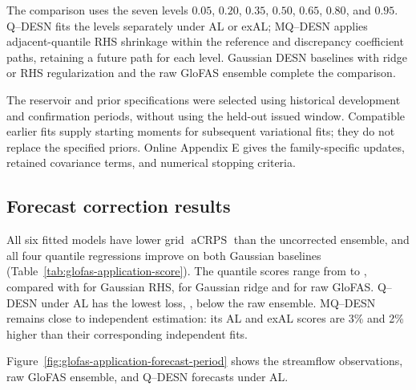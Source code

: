\documentclass[12pt,letterpaper]{article}
\numberwithin{equation}{section}
\newcommand{\aCRPS}{\operatorname{aCRPS}}
\newcommand{\TableStyle}{%
  \footnotesize
  \setlength{\tabcolsep}{4.5pt}%
  \renewcommand{\arraystretch}{1.12}%
}
\begin{document}
The comparison uses the seven levels \(0.05\), \(0.20\), \(0.35\), \(0.50\),
\(0.65\), \(0.80\), and \(0.95\). Q--DESN fits the levels separately under
AL or exAL; MQ--DESN applies adjacent-quantile RHS shrinkage within the
reference and discrepancy coefficient paths, retaining a future path for
each level. Gaussian DESN baselines with ridge or RHS regularization and
the raw GloFAS ensemble complete the comparison.

The reservoir and prior specifications were selected using historical
development and confirmation periods, without using the held-out issued
window. Compatible earlier fits supply starting moments for subsequent
variational fits; they do not replace the specified priors. Online Appendix E
gives the family-specific updates, retained covariance terms, and numerical
stopping criteria.

\subsection{Forecast correction results}

All six fitted models have lower grid \(\aCRPS\) than the uncorrected
ensemble, and all four quantile regressions improve on both Gaussian
baselines (Table~\ref{tab:glofas-application-score}). The quantile scores range from
\GlofasApplicationCurrentQdesnAcrps{} to \GlofasApplicationCurrentJointExalAcrps{},
compared with \GlofasApplicationCurrentNormalRhsAcrps{} for Gaussian RHS,
\GlofasApplicationCurrentNormalRidgeAcrps{} for Gaussian ridge and
\GlofasApplicationCurrentRawAcrps{} for raw GloFAS. Q--DESN under AL has the
lowest loss, \GlofasApplicationCurrentQdesnAcrps{},
\GlofasApplicationCurrentAcrpsReduction{} below the raw ensemble.
MQ--DESN remains close to independent estimation: its AL and exAL scores
are 3\% and 2\% higher than their corresponding independent fits.

Figure~\ref{fig:glofas-application-forecast-period} shows the streamflow
observations, raw GloFAS ensemble, and Q--DESN forecasts under AL.

\begin{table}[!htbp]
\centering
\TableStyle
\caption{Streamflow forecast comparison. Grid \(\aCRPS\) is evaluated on
the \(\log(1+\mathrm{flow})\) scale and averaged with equal weight over the
\GlofasApplicationCurrentScoredHorizons{} issued horizons. Lower scores
are better.}
\label{tab:glofas-application-score}

\end{table}
\end{document}
